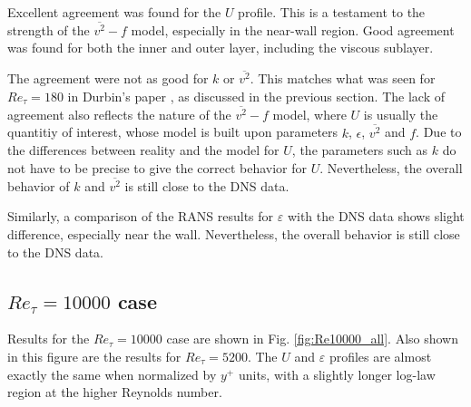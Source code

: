 \documentclass[a4paper,11pt]{article}
\begin{document}
Excellent agreement was found for the $U$ profile.  This is a testament to the strength of the $\overline{v^2}-f$ model, especially in the near-wall region.  Good agreement was found for both the inner and outer layer, including the viscous sublayer.

The agreement were not as good for $k$ or $\overline{v^2}$.  This matches what was seen for $Re_{\tau} = 180$ in Durbin's paper \cite{durbin180}, as discussed in the previous section.  The lack of agreement also reflects the nature of the $\overline{v^2}-f$ model, where $U$ is usually the quantitiy of interest, whose model is built upon parameters $k$, $\epsilon$, $\overline{v^2}$ and $f$.  Due to the differences between reality and the model for $U$, the parameters such as $k$ do not have to be precise to give the correct behavior for $U$. Nevertheless, the overall behavior of $k$ and $\overline{v^2}$ is still close to the DNS data.

Similarly, a comparison of the RANS results for $\varepsilon$ with the DNS data shows slight difference, especially near the wall. Nevertheless, the overall behavior is still close to the DNS data.

\subsection{$Re_{\tau} = 10000$ case}

Results for the $Re_{\tau} = 10000$ case are shown in Fig. \ref{fig:Re10000_all}.  Also shown in this figure are the results for $Re_{\tau} = 5200$.  The $U$ and $\varepsilon$ profiles are almost exactly the same when normalized by $y^+$ units, with a slightly longer log-law region at the higher Reynolds number.
\end{document}
